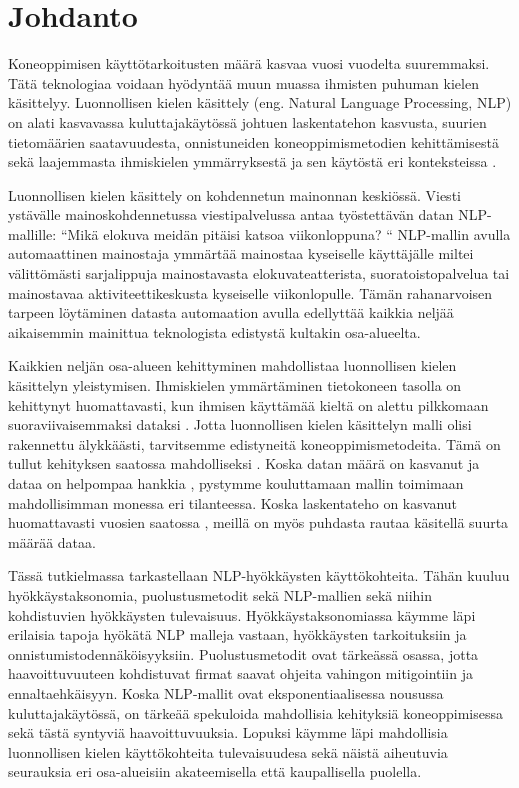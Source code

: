 \chapter{Johdanto\label{intro}}

Koneoppimisen käyttötarkoitusten määrä kasvaa vuosi vuodelta suuremmaksi. Tätä teknologiaa voidaan hyödyntää muun muassa ihmisten puhuman kielen käsittelyy. Luonnollisen kielen käsittely (eng. Natural Language Processing, NLP) on alati kasvavassa kuluttajakäytössä johtuen laskentatehon kasvusta, suurien tietomäärien saatavuudesta, onnistuneiden koneoppimismetodien kehittämisestä sekä laajemmasta ihmiskielen ymmärryksestä ja sen käytöstä eri konteksteissa \citep{doi:10.1126/science.aaa8685}.

Luonnollisen kielen käsittely on kohdennetun mainonnan keskiössä. Viesti ystävälle mainoskohdennetussa viestipalvelussa antaa työstettävän datan NLP-mallille: ``Mikä elokuva meidän pitäisi katsoa viikonloppuna? `` NLP-mallin avulla automaattinen mainostaja ymmärtää mainostaa kyseiselle käyttäjälle miltei välittömästi sarjalippuja mainostavasta elokuvateatterista, suoratoistopalvelua tai mainostavaa aktiviteettikeskusta kyseiselle viikonlopulle. Tämän rahanarvoisen tarpeen löytäminen datasta automaation avulla edellyttää kaikkia neljää aikaisemmin mainittua teknologista edistystä kultakin osa-alueelta.

Kaikkien neljän osa-alueen kehittyminen mahdollistaa luonnollisen kielen käsittelyn yleistymisen. Ihmiskielen ymmärtäminen tietokoneen tasolla on kehittynyt huomattavasti, kun ihmisen käyttämää kieltä on alettu pilkkomaan suoraviivaisemmaksi dataksi \citep{https://doi.org/10.1002/aris.1440370103}. Jotta luonnollisen kielen käsittelyn malli olisi rakennettu älykkäästi, tarvitsemme edistyneitä koneoppimismetodeita. Tämä on tullut kehityksen saatossa mahdolliseksi \citep{jordan2015machine}. Koska datan määrä on kasvanut ja dataa on helpompaa hankkia \citep{gopalakrishnan2018deep}, pystymme kouluttamaan mallin toimimaan mahdollisimman monessa eri tilanteessa. Koska laskentateho on kasvanut huomattavasti vuosien saatossa \citep{moore1965cramming}, meillä on myös puhdasta rautaa käsitellä suurta määrää dataa.

Tässä tutkielmassa tarkastellaan NLP-hyökkäysten käyttökohteita. Tähän kuuluu hyökkäystaksonomia, puolustusmetodit sekä NLP-mallien sekä niihin kohdistuvien hyökkäysten tulevaisuus. Hyökkäystaksonomiassa käymme läpi erilaisia tapoja hyökätä NLP\- malleja vastaan, hyökkäysten tarkoituksiin ja onnistumistodennäköisyyksiin. Puolustusmetodit ovat tärkeässä osassa, jotta haavoittuvuuteen kohdistuvat firmat saavat ohjeita vahingon mitigointiin ja ennaltaehkäisyyn. Koska NLP-mallit ovat eksponentiaalisessa nousussa kuluttajakäytössä, on tärkeää spekuloida mahdollisia kehityksiä koneoppimisessa sekä tästä syntyviä haavoittuvuuksia. Lopuksi käymme läpi mahdollisia luonnollisen kielen käyttökohteita tulevaisuudesa sekä näistä aiheutuvia seurauksia eri osa-alueisiin akateemisella että kaupallisella puolella.